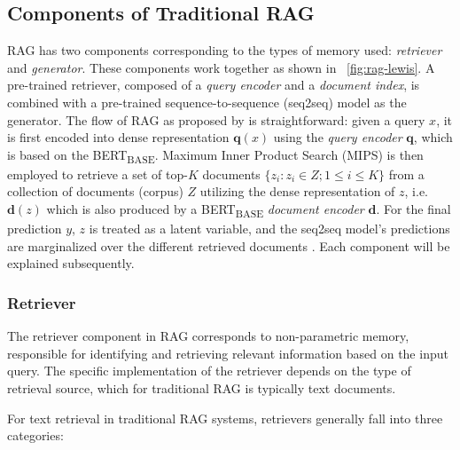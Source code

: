 \subsection{Components of Traditional RAG}
\label{sec:rag-components}
RAG has two components corresponding to the types of memory used: \textit{retriever} and \textit{generator}. These components work together as shown in \pic~\ref{fig:rag-lewis}. A pre-trained retriever, composed of a \textit{query encoder} and a \textit{document index}, is combined with a pre-trained sequence-to-sequence (seq2seq) model as the generator. The flow of RAG as proposed by \cite{lewis2021retrievalaugmentedgenerationknowledgeintensivenlp} is straightforward: given a query $x$, it is first encoded into dense representation $\textbf{q}(x)$ using the \textit{query encoder} $\textbf{q}$, which is based on the BERT\textsubscript{BASE}. Maximum Inner Product Search (MIPS) is then employed to retrieve a set of top-$K$ documents $\{z_i \colon z_i \in Z; 1 \leq i \leq K\}$ from a collection of documents (corpus) $Z$ utilizing the dense representation of $z$, i.e. $\textbf{d}(z)$ which is also produced by a BERT\textsubscript{BASE} \textit{document encoder} $\textbf{d}$. For the final prediction $y$, $z$ is treated as a latent variable, and the seq2seq model’s predictions are marginalized over the different retrieved documents \citep{lewis2021retrievalaugmentedgenerationknowledgeintensivenlp}. Each component will be explained subsequently.

\subsubsection{Retriever}
\label{chap2:rag-retriever}
The retriever component in RAG corresponds to non-parametric memory, responsible for identifying and retrieving relevant information based on the input query. The specific implementation of the retriever depends on the type of retrieval source, which for traditional RAG is typically text documents.

For text retrieval in traditional RAG systems, retrievers generally fall into three categories:

